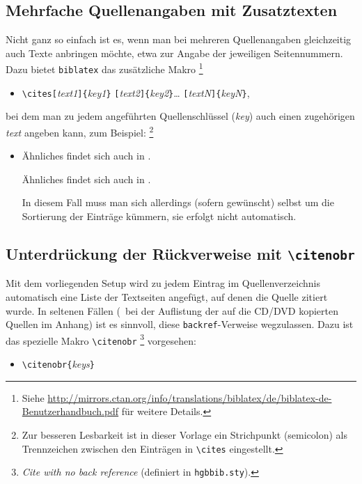 \subsection{Mehrfache Quellenangaben mit Zusatztexten}

Nicht ganz so einfach ist es, wenn man bei mehreren Quellenangaben gleichzeitig
auch Texte anbringen möchte, etwa zur Angabe der jeweiligen Seitennummern.
Dazu bietet \texttt{biblatex} das zusätzliche Makro%
\footnote{Siehe \url{http://mirrors.ctan.org/info/translations/biblatex/de/biblatex-de-Benutzerhandbuch.pdf}
für weitere Details.}
%
\begin{itemize}
\item[] 
\verb!\cites[!\textit{text1}\verb!]{!\textit{key1}\verb!}!%
      \verb![!\textit{text2}\verb!]{!\textit{key2}\verb!}!\ldots%
			\verb![!\textit{textN}\verb!]{!\textit{keyN}\verb!}!,
\end{itemize}
bei dem man zu jedem angeführten Quellenschlüssel (\textit{key}) auch einen zugehörigen \textit{text}
angeben kann, zum Beispiel:%
\footnote{Zur besseren Lesbarkeit ist in dieser Vorlage ein Strichpunkt (semicolon) als Trennzeichen zwischen
den Einträgen in \texttt{\textbackslash cites} eingestellt.}
%
\begin{itemize}
\item
Ähnliches findet sich auch in 
\cites[Kap.~2]{Artner2007}[Abschn.~3.6]{Drake1948}[S.~5--7]{Eberl1987}.
\begin{LaTeXCode}[numbers=none]
Ähnliches findet sich auch in
\cites[Kap.~2]{Artner2007}[Abschn.~3.6]{Drake1948}[S.~5--7]{Eberl1987}.
\end{LaTeXCode}
In diesem Fall muss man sich allerdings (sofern gewünscht) selbst um die Sortierung der Einträge kümmern,
sie erfolgt nicht automatisch.
\end{itemize}


\subsection{Unterdrückung der Rückverweise mit \texttt{\textbackslash citenobr}}

Mit dem vorliegenden Setup wird zu jedem Eintrag im Quellenverzeichnis automatisch 
eine Liste der Textseiten angefügt, auf denen die Quelle zitiert wurde.
In seltenen Fällen (\zB\ bei der Auflistung der auf die CD/DVD kopierten Quellen im Anhang)
ist es sinnvoll, diese \texttt{backref}-Verweise wegzulassen. Dazu ist das spezielle Makro
\texttt{\textbackslash citenobr}%
\footnote{\emph{Cite with no back reference} (definiert in \texttt{hgbbib.sty}).}
vorgesehen:
%
\begin{itemize}
\item[] \verb!\citenobr{!\textit{keys}\verb!}! 
\end{itemize}



